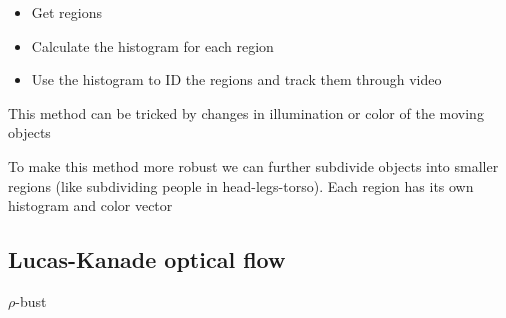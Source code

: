 \documentclass{article}
\begin{document}
\begin{itemize}
    \item Get regions
    \item Calculate the histogram for each region
    \item Use the histogram to ID the regions and track them through video
\end{itemize}
This method can be tricked by changes in illumination or color of the moving objects

To make this method more robust we can further subdivide objects into smaller regions (like subdividing people in head-legs-torso). Each region has its own histogram and color vector

\subsection{Lucas-Kanade optical flow}
$\rho$-bust
\end{document}
